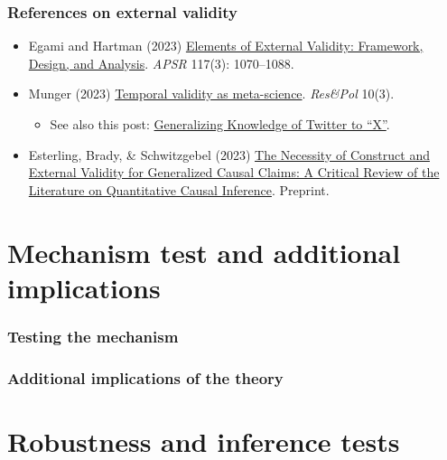 \documentclass[aspectratio=43]{beamer}
\begin{document}
\begin{frame}
\frametitle{References on external validity}
\centering

\begin{itemize}
  \item Egami and Hartman (2023) \href{https://doi.org/10.1017/S0003055422000880}{Elements of External Validity: Framework, Design, and Analysis}. \textit{APSR} 117(3): 1070--1088.
  \item Munger (2023) \href{https://doi.org/10.1177/20531680231187271}{Temporal validity as meta-science}. \textit{Res\&Pol} 10(3).
  \begin{itemize}
    \item See also this post: \href{https://kevinmunger.substack.com/p/generalizing-knowledge-of-twitter}{Generalizing Knowledge of Twitter to ``X''}.
  \end{itemize}
  \item Esterling, Brady, \& Schwitzgebel (2023) \href{https://osf.io/2s8w5/}{The Necessity of Construct and External Validity for Generalized Causal Claims: A Critical Review of the Literature on Quantitative Causal Inference}. Preprint.
\end{itemize}

\end{frame}

\section{Mechanism test and additional implications}

\begin{frame}
\frametitle{Testing the mechanism}
\centering



\end{frame}

\begin{frame}
\frametitle{Additional implications of the theory}
\centering



\end{frame}

\section{Robustness and inference tests}
\end{document}
